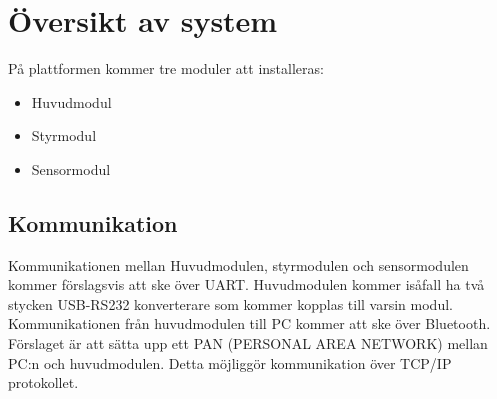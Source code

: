 \section{Översikt av system}
På plattformen kommer tre moduler att installeras:

\begin{itemize}
\item Huvudmodul
\item Styrmodul
\item Sensormodul
\end{itemize}
\subsection{Kommunikation}
Kommunikationen mellan Huvudmodulen, styrmodulen och sensormodulen kommer förslagsvis att ske över UART. Huvudmodulen kommer isåfall ha två stycken USB-RS232 konverterare som kommer kopplas till varsin modul. Kommunikationen från huvudmodulen till PC kommer att ske över Bluetooth. Förslaget är att sätta upp ett PAN (PERSONAL AREA NETWORK) mellan PC:n och huvudmodulen. Detta möjliggör kommunikation över TCP/IP protokollet.

